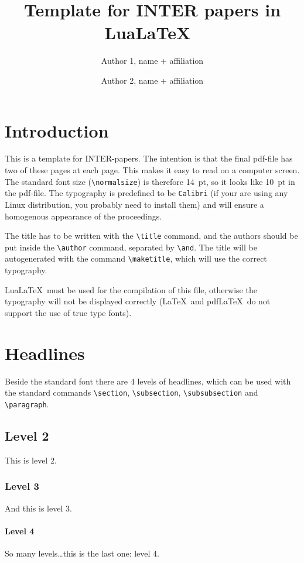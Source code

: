 \documentclass[unicode-math]{interarticle}
\title{Template for INTER papers in Lua\LaTeX\ }
\author{%
  Author 1, name + affiliation \and %
  Author 2, name + affiliation %
}
\newcommand\comm[1]{\texttt{\textbackslash #1}}
\begin{document}
\maketitle


\section{Introduction}
This is a template for INTER-papers.
The intention is that the final pdf-file has two of these pages at each page.
This makes it easy to read on a computer screen.
The standard font size (\comm{normalsize}) is therefore \SI{14}{pt}, so it looks like \SI{10}{pt} in the pdf-file.
The typography is predefined to be \texttt{Calibri} (if your are using any Linux distribution, you probably need to install them) and will ensure a homogenous appearance of the proceedings.\par

The title has to be written with the \comm{title} command, and the authors should be put inside the \comm{author} command, separated by \comm{and}.
The title will be autogenerated with the command \comm{maketitle}, which will use the correct typography.\par

Lua\LaTeX\ must be used for the compilation of this file, otherwise the typography will not be displayed correctly (\LaTeX\ and pdf\LaTeX\ do not support the use of true type fonts).\par

\section{Headlines}
Beside the standard font there are 4 levels of headlines, which can be used with the standard commands \comm{section}, \comm{subsection}, \comm{subsubsection} and \comm{paragraph}.

\subsection{Level 2}
This is level 2.

\subsubsection{Level 3}
And this is level 3.

\paragraph{Level 4}
So many levels\ldots this is the last one: level 4.
\end{document}
